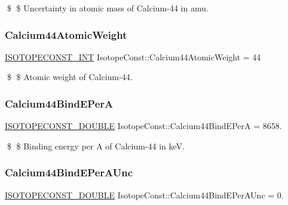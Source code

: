 \$ \$ Uncertainty in atomic mass of Calcium-\/44 in amu. \mbox{\label{group___isotope_const-_calcium-_ca44_gab20966105f9f90ae563c1bcdf479c7ff}} 
\subsubsection{\texorpdfstring{Calcium44\+Atomic\+Weight}{Calcium44AtomicWeight}}
{\footnotesize\ttfamily \mbox{\hyperlink{group___isotope_const-_macros_ga5f18360b3e99483a35c32d789e62621c}{I\+S\+O\+T\+O\+P\+E\+C\+O\+N\+S\+T\+\_\+\+I\+NT}} Isotope\+Const\+::\+Calcium44\+Atomic\+Weight = 44}

\$ \$ Atomic weight of Calcium-\/44. \mbox{\label{group___isotope_const-_calcium-_ca44_ga0845336452e276ab0f0d44d1cd2f961e}} 
\subsubsection{\texorpdfstring{Calcium44\+Bind\+E\+PerA}{Calcium44BindEPerA}}
{\footnotesize\ttfamily \mbox{\hyperlink{group___isotope_const-_macros_ga8f45a7272ce02c0b4c65c44636ed719a}{I\+S\+O\+T\+O\+P\+E\+C\+O\+N\+S\+T\+\_\+\+D\+O\+U\+B\+LE}} Isotope\+Const\+::\+Calcium44\+Bind\+E\+PerA = 8658.}

\$ \$ Binding energy per A of Calcium-\/44 in keV. \mbox{\label{group___isotope_const-_calcium-_ca44_gac24a5ff58153c35161afdcb688218360}} 
\subsubsection{\texorpdfstring{Calcium44\+Bind\+E\+Per\+A\+Unc}{Calcium44BindEPerAUnc}}
{\footnotesize\ttfamily \mbox{\hyperlink{group___isotope_const-_macros_ga8f45a7272ce02c0b4c65c44636ed719a}{I\+S\+O\+T\+O\+P\+E\+C\+O\+N\+S\+T\+\_\+\+D\+O\+U\+B\+LE}} Isotope\+Const\+::\+Calcium44\+Bind\+E\+Per\+A\+Unc = 0.}

